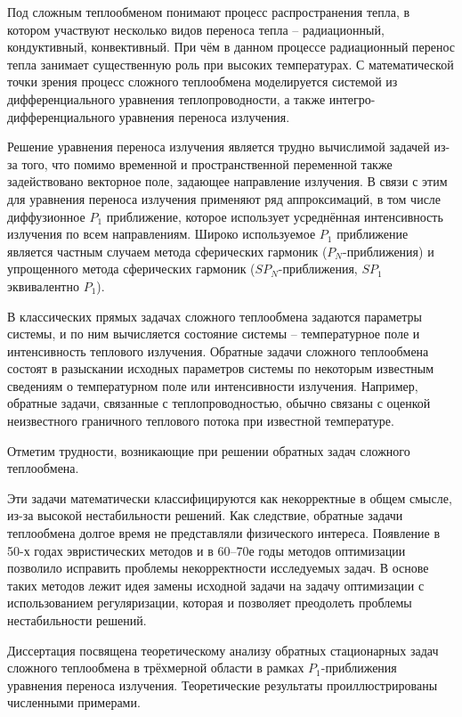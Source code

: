 {\actuality}
Под сложным теплообменом понимают процесс распространения тепла,
в котором участвуют несколько видов переноса тепла – радиационный, кондуктивный, конвективный.
При чём в данном процессе радиационный перенос тепла занимает существенную роль при высоких температурах.
С математической точки зрения процесс сложного теплообмена моделируется системой из
дифференциального уравнения теплопроводности, а также интегро-дифференциального
уравнения переноса излучения.


Решение уравнения переноса излучения является трудно вычислимой задачей из-за того,
что помимо временной и пространственной переменной также задействовано
векторное поле, задающее направление излучения.
В связи с этим для уравнения переноса излучения применяют ряд аппроксимаций,
в том числе диффузионное $P_1$ приближение, которое использует
усреднённая интенсивность излучения по всем направлениям.
Широко используемое $P_1$ приближение является частным случаем метода сферических
гармоник ($P_N$-приближения) и упрощенного метода сферических гармоник
($SP_N$-приближения, $SP_1$ эквивалентно $P_1$).


В классических прямых задачах сложного теплообмена задаются параметры системы, и по ним вычисляется
состояние системы – температурное поле и интенсивность теплового излучения.
Обратные задачи сложного теплообмена состоят в разыскании исходных параметров системы по некоторым
известным сведениям о температурном поле или интенсивности излучения.
Например, обратные задачи, связанные с теплопроводностью, обычно связаны с
оценкой неизвестного граничного теплового потока при известной температуре.


Отметим трудности, возникающие при решении обратных задач сложного теплообмена.


Эти задачи математически классифицируются как некорректные в общем смысле,
из-за высокой нестабильности решений.
Как следствие, обратные задачи теплообмена долгое время не представляли физического интереса.
Появление в 50-х годах эвристических методов и в 60–70е годы методов оптимизации
позволило исправить проблемы некорректности исследуемых задач.
В основе таких методов лежит идея замены исходной задачи на задачу оптимизации
с использованием регуляризации, которая и позволяет преодолеть проблемы нестабильности решений.



Диссертация посвящена теоретическому анализу обратных стационарных
задач сложного теплообмена в трёхмерной области в рамках $P_1$-приближения
уравнения переноса излучения.
Теоретические результаты проиллюстрированы численными примерами.


